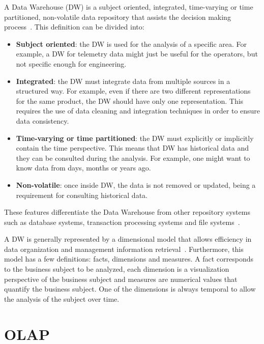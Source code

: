 A Data Warehouse (DW) is a subject oriented, integrated, time-varying or time partitioned, non-volatile data repository that assists the decision making process~\cite{inmonUsingDataWarehouse1994}.
This definition can be divided into:

\begin{itemize}[noitemsep]
  \item \textbf{Subject oriented}: the DW is used for the analysis of a specific area.
    For example, a DW for telemetry data might just be useful for the operators, but not specific enough for engineering.
  \item \textbf{Integrated}: the DW must integrate data from multiple sources in a structured way.
    For example, even if there are two different representations for the same product, the DW should have only one representation.
    This requires the use of data cleaning and integration techniques in order to ensure data consistency.
  \item \textbf{Time-varying or time partitioned}: the DW must explicitly or implicitly contain the time perspective.
    This means that DW has historical data and they can be consulted during the analysis.
    For example, one might want to know data from days, months or years ago.
  \item \textbf{Non-volatile}: once inside DW, the data is not removed or updated, being a requirement for consulting historical data.
\end{itemize}

These features differentiate the Data Warehouse from other repository systems such as database systems, transaction processing systems and file systems~\cite{hanDataMiningConcepts2011}.

A DW is generally represented by a dimensional model that allows efficiency in data organization and management information retrieval~\cite{kimballDataWarehouseToolkit2013}.
Furthermore, this model has a few definitions: facts, dimensions and measures.
A fact corresponds to the business subject to be analyzed, each dimension is a visualization perspective of the business subject and measures are numerical values that quantify the business subject.
One of the dimensions is always temporal to allow the analysis of the subject over time.

\section{OLAP}\label{ch:fun:olap}

